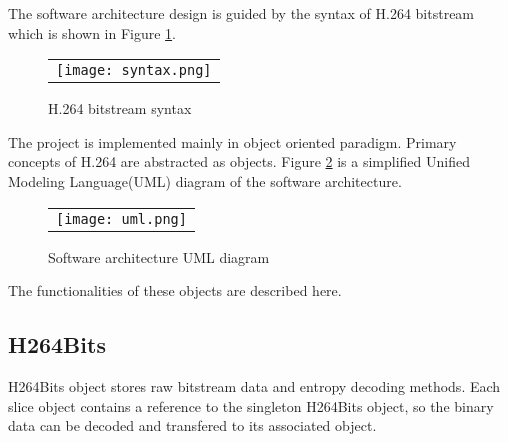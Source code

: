 \documentclass[../main.tex]{subfiles}
\begin{document}
The software architecture design is guided by the syntax of H.264 bitstream which is shown in Figure \ref{fig:syntax}.

\begin{figure} [ht]
\begin{center}
\begin{tabular}{c} %
\texttt{[image: syntax.png]}
\end{tabular}
\end{center}
\caption[syntax] 
{ \label{fig:syntax} H.264 bitstream syntax \cite{team2003advanced}}
\end{figure} 

The project is implemented mainly in object oriented paradigm.
Primary concepts of H.264 are abstracted as objects.
Figure \ref{fig:uml} is a simplified Unified Modeling Language(UML) diagram of the software architecture.

\begin{figure} [ht]
\begin{center}
\begin{tabular}{c} %
\texttt{[image: uml.png]}
\end{tabular}
\end{center}
\caption[uml] 
{ \label{fig:uml} Software architecture UML diagram}
\end{figure} 

The functionalities of these objects are described here.

\subsection{H264Bits}
H264Bits object stores raw bitstream data and entropy decoding methods.
Each slice object contains a reference to the singleton H264Bits object, 
so the binary data can be decoded and transfered to its associated object.

\end{document}
